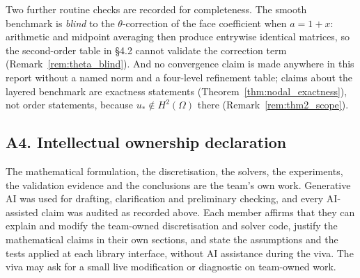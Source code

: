 Two further routine checks are recorded for completeness. The smooth benchmark
is \emph{blind} to the $\theta$-correction of the face coefficient when
$a=1+x$: arithmetic and midpoint averaging then produce entrywise identical
matrices, so the second-order table in \S4.2 cannot validate the correction
term (Remark~\ref{rem:theta_blind}). And no convergence claim is made anywhere
in this report without a named norm and a four-level refinement table; claims
about the layered benchmark are exactness statements
(Theorem~\ref{thm:nodal_exactness}), not order statements, because
$u_*\notin H^2(\Omega)$ there (Remark~\ref{rem:thm2_scope}).

\subsection*{A4. Intellectual ownership declaration}

The mathematical formulation, the discretisation, the solvers, the experiments,
the validation evidence and the conclusions are the team's own work.
Generative AI was used for drafting, clarification and preliminary checking, and
every AI-assisted claim was audited as recorded above. Each member affirms that
they can explain and modify the team-owned discretisation and solver code,
justify the mathematical claims in their own sections, and state the
assumptions and the tests applied at each library interface, without AI
assistance during the viva. The viva may ask for a small live modification or
diagnostic on team-owned work.

